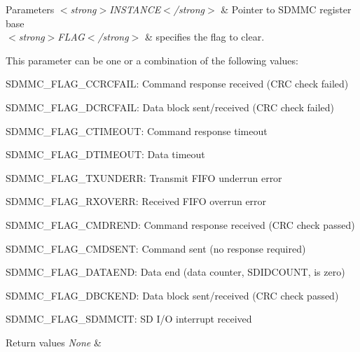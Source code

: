 \begin{DoxyParams}{Parameters}
{\em $<$strong$>$\+I\+N\+S\+T\+A\+N\+C\+E$<$/strong$>$} & Pointer to S\+D\+M\+MC register base\\
\hline
{\em $<$strong$>$\+F\+L\+A\+G$<$/strong$>$} & specifies the flag to clear.\\
\hline
\end{DoxyParams}
This parameter can be one or a combination of the following values\+: \begin{DoxyItemize}
\item S\+D\+M\+M\+C\+\_\+\+F\+L\+A\+G\+\_\+\+C\+C\+R\+C\+F\+A\+IL\+: Command response received (C\+RC check failed) \item S\+D\+M\+M\+C\+\_\+\+F\+L\+A\+G\+\_\+\+D\+C\+R\+C\+F\+A\+IL\+: Data block sent/received (C\+RC check failed) \item S\+D\+M\+M\+C\+\_\+\+F\+L\+A\+G\+\_\+\+C\+T\+I\+M\+E\+O\+UT\+: Command response timeout \item S\+D\+M\+M\+C\+\_\+\+F\+L\+A\+G\+\_\+\+D\+T\+I\+M\+E\+O\+UT\+: Data timeout \item S\+D\+M\+M\+C\+\_\+\+F\+L\+A\+G\+\_\+\+T\+X\+U\+N\+D\+E\+RR\+: Transmit F\+I\+FO underrun error \item S\+D\+M\+M\+C\+\_\+\+F\+L\+A\+G\+\_\+\+R\+X\+O\+V\+E\+RR\+: Received F\+I\+FO overrun error \item S\+D\+M\+M\+C\+\_\+\+F\+L\+A\+G\+\_\+\+C\+M\+D\+R\+E\+ND\+: Command response received (C\+RC check passed) \item S\+D\+M\+M\+C\+\_\+\+F\+L\+A\+G\+\_\+\+C\+M\+D\+S\+E\+NT\+: Command sent (no response required) \item S\+D\+M\+M\+C\+\_\+\+F\+L\+A\+G\+\_\+\+D\+A\+T\+A\+E\+ND\+: Data end (data counter, S\+D\+I\+D\+C\+O\+U\+NT, is zero) \item S\+D\+M\+M\+C\+\_\+\+F\+L\+A\+G\+\_\+\+D\+B\+C\+K\+E\+ND\+: Data block sent/received (C\+RC check passed) \item S\+D\+M\+M\+C\+\_\+\+F\+L\+A\+G\+\_\+\+S\+D\+M\+M\+C\+IT\+: SD I/O interrupt received 
\begin{DoxyRetVals}{Return values}
{\em None} & \\
\hline
\end{DoxyRetVals}
\end{DoxyItemize}
\mbox{\label{group___s_d_m_m_c___l_l___interrupt___clock_ga86db406c85993ed8b12903ca403538f0}} 
